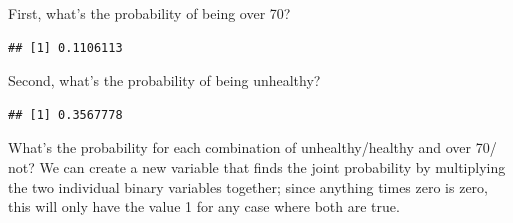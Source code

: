\documentclass[12pt,]{book}
\newenvironment{Shaded}{\begin{snugshade}}{\end{snugshade}}
\newcommand{\CommentTok}[1]{\textcolor[rgb]{0.56,0.35,0.01}{\textit{#1}}}
\newcommand{\DataTypeTok}[1]{\textcolor[rgb]{0.13,0.29,0.53}{#1}}
\newcommand{\KeywordTok}[1]{\textcolor[rgb]{0.13,0.29,0.53}{\textbf{#1}}}
\newcommand{\NormalTok}[1]{#1}
\newcommand{\OperatorTok}[1]{\textcolor[rgb]{0.81,0.36,0.00}{\textbf{#1}}}
\newcommand{\StringTok}[1]{\textcolor[rgb]{0.31,0.60,0.02}{#1}}
\begin{document}
First, what's the probability of being over 70?

\begin{Shaded}
\end{Shaded}

\begin{verbatim}
## [1] 0.1106113
\end{verbatim}

Second, what's the probability of being unhealthy?

\begin{Shaded}
\end{Shaded}

\begin{verbatim}
## [1] 0.3567778
\end{verbatim}

What's the probability for each combination of unhealthy/healthy and over 70/ not? We can create a new variable that finds the joint probability by multiplying the two individual binary variables together; since anything times zero is zero, this will only have the value 1 for any case where both are true.

\begin{Shaded}
\end{Shaded}
\end{document}
